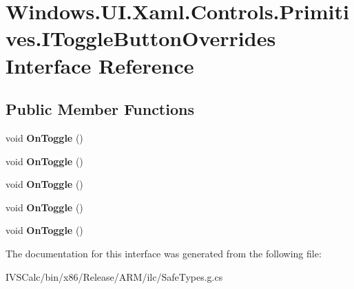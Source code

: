 \hypertarget{interface_windows_1_1_u_i_1_1_xaml_1_1_controls_1_1_primitives_1_1_i_toggle_button_overrides}{}\section{Windows.\+U\+I.\+Xaml.\+Controls.\+Primitives.\+I\+Toggle\+Button\+Overrides Interface Reference}
\label{interface_windows_1_1_u_i_1_1_xaml_1_1_controls_1_1_primitives_1_1_i_toggle_button_overrides}
\subsection*{Public Member Functions}
\begin{DoxyCompactItemize}
\item 
\mbox{\label{interface_windows_1_1_u_i_1_1_xaml_1_1_controls_1_1_primitives_1_1_i_toggle_button_overrides_ab0e9e55bfcceba9db7b4e0055d33d10d}} 
void {\bfseries On\+Toggle} ()
\item 
\mbox{\label{interface_windows_1_1_u_i_1_1_xaml_1_1_controls_1_1_primitives_1_1_i_toggle_button_overrides_ab0e9e55bfcceba9db7b4e0055d33d10d}} 
void {\bfseries On\+Toggle} ()
\item 
\mbox{\label{interface_windows_1_1_u_i_1_1_xaml_1_1_controls_1_1_primitives_1_1_i_toggle_button_overrides_ab0e9e55bfcceba9db7b4e0055d33d10d}} 
void {\bfseries On\+Toggle} ()
\item 
\mbox{\label{interface_windows_1_1_u_i_1_1_xaml_1_1_controls_1_1_primitives_1_1_i_toggle_button_overrides_ab0e9e55bfcceba9db7b4e0055d33d10d}} 
void {\bfseries On\+Toggle} ()
\item 
\mbox{\label{interface_windows_1_1_u_i_1_1_xaml_1_1_controls_1_1_primitives_1_1_i_toggle_button_overrides_ab0e9e55bfcceba9db7b4e0055d33d10d}} 
void {\bfseries On\+Toggle} ()
\end{DoxyCompactItemize}


The documentation for this interface was generated from the following file\+:\begin{DoxyCompactItemize}
\item 
I\+V\+S\+Calc/bin/x86/\+Release/\+A\+R\+M/ilc/Safe\+Types.\+g.\+cs\end{DoxyCompactItemize}
